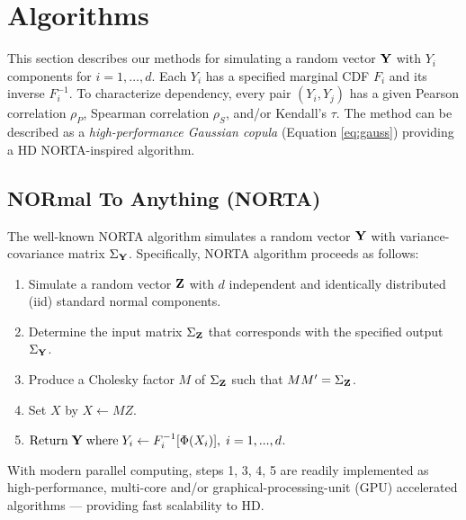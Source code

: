 \documentclass[
]{jss}
\providecommand{\tightlist}{%
  \setlength{\itemsep}{0pt}\setlength{\parskip}{0pt}}
\begin{document}
\clearpage

\hypertarget{algorithms}{%
\section{Algorithms}\label{algorithms}}

This section describes our methods for simulating a random vector \(\bf Y\) with \(Y_i\) components for \(i=1,\ldots,d\). Each \(Y_i\) has a specified marginal CDF \(F_i\) and its inverse \(F^{-1}_i\). To characterize dependency, every pair \((Y_i, Y_j)\) has a given Pearson correlation \(\rho_P\), Spearman correlation \(\rho_S\), and/or Kendall's \(\tau\). The method can be described as a \emph{high-performance Gaussian copula} (Equation \eqref{eq:gauss}) providing a HD NORTA-inspired algorithm.

\hypertarget{normal-to-anything-norta}{%
\subsection{NORmal To Anything (NORTA)}\label{normal-to-anything-norta}}

The well-known NORTA algorithm \citep{Cario1997} simulates a random vector \(\bf Y\) with variance-covariance matrix \(\Sigma_{\bf Y}\). Specifically, NORTA algorithm proceeds as follows:


\begin{enumerate}
\def\labelenumi{\arabic{enumi}.}
\tightlist
\item
  Simulate a random vector \(\bf Z\) with \(d\) independent and identically distributed (iid) standard normal components.
\item
  Determine the input matrix \(\Sigma_{\bf Z}\) that corresponds with the specified output \(\Sigma_{\bf Y}\).
\item
  Produce a Cholesky factor \(M\) of \(\Sigma_{\bf Z}\) such that \(M M^{\prime}=\Sigma_{\bf Z}\).
\item
  Set \(X\) by \(X \gets MZ\).
\item
  \(\text{Return} \; {\bf Y} \; \text{where} \; Y_i \gets F_i^{-1}[\Phi(X_i)], \; i=1,...,d\).
\end{enumerate}


With modern parallel computing, steps 1, 3, 4, 5 are readily implemented as high-performance, multi-core and/or graphical-processing-unit (GPU) accelerated algorithms --- providing fast scalability to HD.
\end{document}
